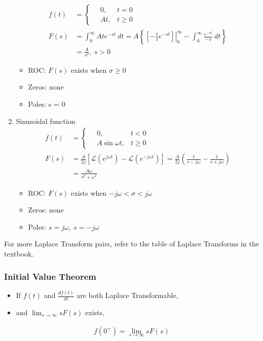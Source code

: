\documentclass[a4paper]{article}
\begin{document}
\begin{enumerate}[label=\alph*.]
\begin{align*}
        f(t) &= \begin{cases}
        \quad 0, & t = 0\\
        \quad At, & t\geq 0
        \end{cases}\\
        F(s) &= \int_0^\infty Ate^{-st}\ dt = A\left\{\left.\left[-\frac{t}{s}e^{-st}\right]\right|_0^\infty - \int_0^\infty\frac{e^{-st}}{-s}\ dt \right\}\\
        &= \frac{A}{s^2},\ s > 0
    \end{align*}
    \begin{itemize}
        \item ROC: $F(s)$ exists when $\sigma \geq 0$
        \item Zeros: none
        \item Poles: s = 0
    \end{itemize}
    \item Sinusoidal function
    \begin{align*}
        f(t) &= \begin{cases}
        \quad 0, & t < 0\\
        \quad A\sin\omega t, & t\geq 0
        \end{cases}\\
        F(s) &= \frac{A}{2j}\left[\mathscr{L}\left(e^{j\omega t}\right)-\mathscr{L}\left(e^{-j\omega t}\right)\right] = \frac{A}{2j}\left(\frac{1}{s-j\omega}-\frac{1}{s+j\omega}\right)\\
        &= \frac{A\omega}{s^2+\omega^2}
    \end{align*}
    \begin{itemize}
        \item ROC: $F(s)$ exists when $-j\omega < \sigma < j\omega$
        \item Zeros: none
        \item Poles: $s=j\omega,\ s=-j\omega$
    \end{itemize}
\end{enumerate}
\noindent For more Laplace Transform pairs, refer to the table of Laplace Transforms in the textbook.
\subsubsection{Initial Value Theorem}
\begin{itemize}
    \item If $f(t)$ and $\displaystyle\frac{df(t)}{dt}$ are both Laplace Transformable,
    \item and $\displaystyle\lim_{s\rightarrow\infty} sF(s)$ exists,
\end{itemize}
\begin{align*}
    f(0^+) = \lim_{s\rightarrow\infty} sF(s)
\end{align*}
\end{document}
